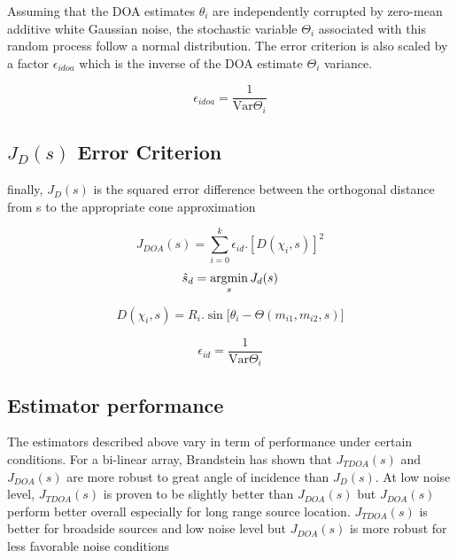 Assuming that the DOA estimates $\theta_{i}$ are independently corrupted by zero-mean additive white Gaussian noise, the stochastic variable $\Theta_{i}$ associated with this random process follow a normal distribution. The error criterion is also scaled by a factor $\epsilon_{idoa}$ which is the inverse of the DOA estimate $\Theta_{i}$ variance. 

\begin{equation}
\epsilon_{idoa}=\frac{1}{\mathrm{Var}{\Theta_{i}}}
\label{eq:epsilonjtdoa}
\end{equation}

\subsection{$J_{D}(s)$ Error Criterion}

finally, $J_{D}(s)$ is the squared error difference between the orthogonal distance from s to the appropriate cone approximation 

\begin{equation}
J_{DOA}(s) = {\sum}_{i=0}^k \epsilon_{id}.[D(\chi_{i},s)]^2
\label{eq:jd}
\end{equation}
\begin{equation}
\hat{s}_{d}= \argmin_{s} J_{d}(s) 
\end{equation}


\begin{equation}
D(\chi_{i},s)=R_{i}.\sin{[\theta_{i}-\Theta(m_{i1},m_{i2},s)}]  
\end{equation}

\begin{equation}
 \epsilon_{id}=\frac{1}{\mathrm{Var}{\Theta_{i}}}    
\end{equation}

\subsection{Estimator performance}

The estimators described above vary in term of performance under certain conditions. For a bi-linear array, Brandstein has shown that $J_{TDOA}(s)$ and $J_{DOA}(s)$ are more robust to great angle of incidence than $J_{D}(s)$. At low noise level, $J_{TDOA}(s)$ is proven to be slightly better than $J_{DOA}(s)$ but $J_{DOA}(s)$ perform better overall especially for long range source location. $J_{TDOA}(s)$ is better for broadside sources and low noise level but $J_{DOA}(s)$ is more robust for less favorable noise conditions

\fi